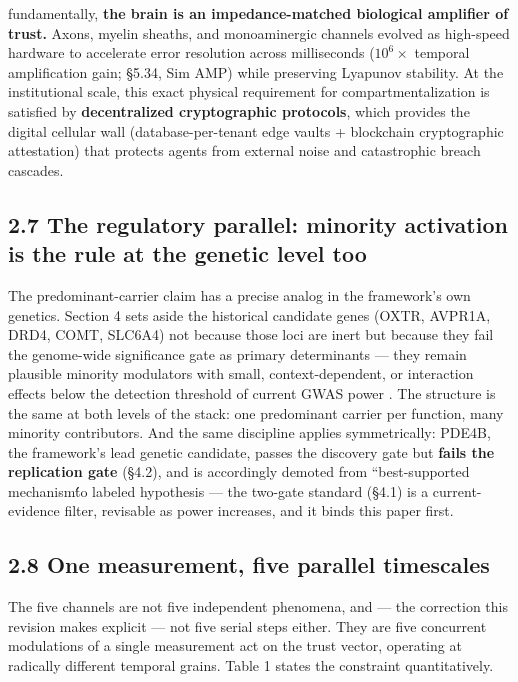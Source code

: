 \documentclass[
]{article}
\begin{document}
\begin{enumerate}
  fundamentally, \textbf{the brain is an impedance-matched biological
  amplifier of trust.} Axons, myelin sheaths, and monoaminergic channels
  evolved as high-speed hardware to accelerate error resolution across
  milliseconds (\(10^6\times\) temporal amplification gain; §5.34, Sim
  AMP) while preserving Lyapunov stability. At the institutional scale,
  this exact physical requirement for compartmentalization is satisfied
  by \textbf{decentralized cryptographic protocols}, which provides the
  digital cellular wall (database-per-tenant edge vaults + blockchain
  cryptographic attestation) that protects agents from external noise
  and catastrophic breach cascades.
\end{enumerate}

\subsection{2.7 The regulatory parallel: minority activation is the rule
at the genetic level
too}\label{the-regulatory-parallel-minority-activation-is-the-rule-at-the-genetic-level-too}

The predominant-carrier claim has a precise analog in the framework's
own genetics. Section 4 sets aside the historical candidate genes (OXTR,
AVPR1A, DRD4, COMT, SLC6A4) not because those loci are inert but because
they fail the genome-wide significance gate as primary determinants ---
they remain plausible minority modulators with small, context-dependent,
or interaction effects below the detection threshold of current GWAS
power . The structure is the same at both levels of the stack: one
predominant carrier per function, many minority contributors. And the
same discipline applies symmetrically: PDE4B, the framework's lead
genetic candidate, passes the discovery gate but \textbf{fails the
replication gate} (§4.2), and is accordingly demoted from
``best-supported mechanismt́́o labeled hypothesis --- the two-gate
standard (§4.1) is a current-evidence filter, revisable as power
increases, and it binds this paper first.

\subsection{2.8 One measurement, five parallel
timescales}\label{one-measurement-five-parallel-timescales}

The five channels are not five independent phenomena, and --- the
correction this revision makes explicit --- not five serial steps
either. They are five concurrent modulations of a single measurement act
on the trust vector, operating at radically different temporal grains.
Table 1 states the constraint quantitatively.
\end{document}
